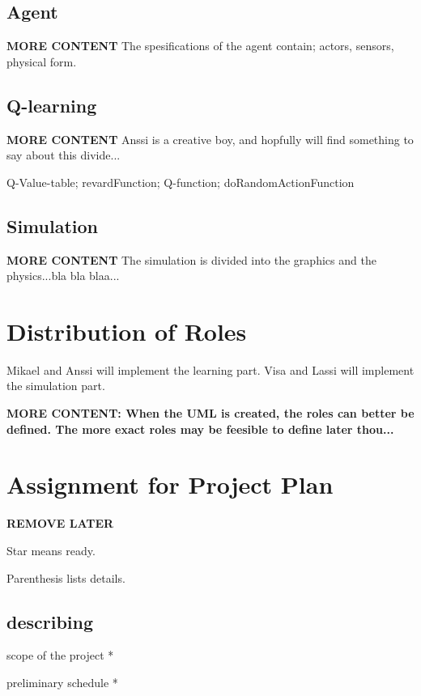 \documentclass{article}
\begin{document}
\subsection{Agent}
\textbf{MORE CONTENT}
The spesifications of the agent contain; actors, sensors, physical form.


\subsection{Q-learning}
\textbf{MORE CONTENT}
Anssi is a creative boy, and hopfully will find something to say about this
divide...

Q-Value-table; revardFunction; Q-function; doRandomActionFunction


\subsection{Simulation}
\textbf{MORE CONTENT}
The simulation is divided into the graphics and the physics...bla bla blaa...



\section{Distribution of Roles}
Mikael and Anssi will implement the learning part.
Visa and Lassi will implement the simulation part.

\textbf{MORE CONTENT: When the UML is created, the roles can better be defined.
The more exact roles may be feesible to define later thou...}

\newpage



\section{Assignment for Project Plan}
\textbf{REMOVE LATER}

Star means ready.

Parenthesis lists details.

\subsection{describing}

scope of the project *

preliminary schedule *
\end{document}
